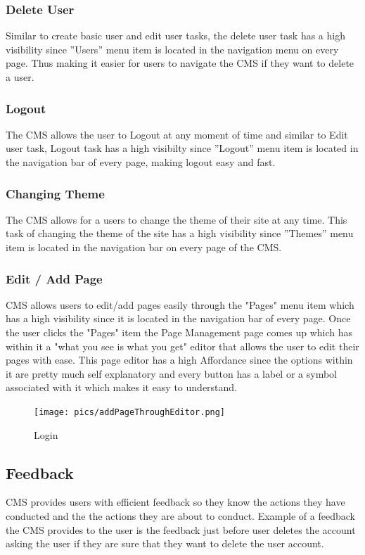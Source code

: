 \documentclass[12pt]{article}
\begin{document}
\subsubsection{Delete User}
Similar to create basic user and edit user tasks, the delete user task has a high visibility since ''Users'' menu item is located in the navigation menu on every page. Thus making it easier for users to navigate the CMS if they want to delete a user.

\subsubsection{Logout}
The CMS allows the user to Logout at any moment of time and similar to Edit user task, Logout task has a high visibilty since ''Logout'' menu item is located in the navigation bar of every page, making logout easy and fast.

\subsubsection{Changing Theme}
The CMS allows for a users to change the theme of their site at any time. This task of changing the theme of the site has a high visibility since ''Themes'' menu item is located in the navigation bar on every page of the CMS.

\subsubsection{Edit / Add Page}
CMS allows users to edit/add pages easily through the "Pages" menu item which has a high visibility since it is located in the navigation bar of every page. Once the user clicks the "Pages" item the Page Management page comes up which has within it a "what you see is what you get" editor that allows the user to edit their pages with ease. This page editor has a high Affordance since the options within it are pretty much self explanatory and every button has a label or a symbol associated with it which makes it easy to understand.

\begin{figure}[H]
 \centering
    \texttt{[image: pics/addPageThroughEditor.png]}
    \caption{Login}
\end{figure}


\subsection{Feedback}
CMS provides users with efficient feedback so they know the actions they have conducted and the the actions they are about to conduct. Example of a feedback the CMS provides to the user is the feedback just before user deletes the account asking the user if they are sure that they want to delete the user account.
\end{document}
